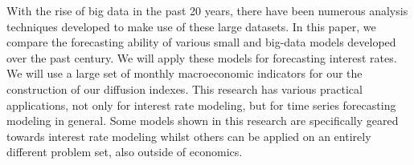 With the rise of big data in the past 20 years, there have been numerous analysis techniques developed to make use of these large datasets. In this paper, we compare the forecasting ability of various small and big-data models developed over the past century. We will apply these models for forecasting interest rates. We will use a large set of monthly macroeconomic indicators for our the construction of our diffusion indexes. This research has various practical applications, not only for interest rate modeling, but for time series forecasting modeling in general. Some models shown in this research are specifically geared towards interest rate modeling whilst others can be applied on an entirely different problem set, also outside of economics. 